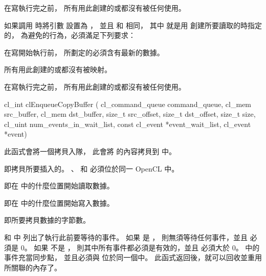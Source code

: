 \item 在寫執行完之前，
所有用此創建的或都沒有被任何使用。
\stopigBase

如果調用  時將引數  設置為 ，
並且  和  相同，
其中  就是用  創建所要讀取的時指定的，
為避免的行為，必須滿足下列要求：
\startigBase
\item 在寫開始執行前，
 所劃定的必須含有最新的數據。

\item 所有用此創建的或都沒有被映射。

\item 在寫執行完之前，
所有用此創建的或都沒有被任何使用。
\stopigBase
\stopnotepar%


\startCLFUNC
cl_int clEnqueueCopyBuffer (
			cl_command_queue command_queue,
			cl_mem src_buffer,
			cl_mem dst_buffer,
			size_t src_offset,
			size_t dst_offset,
			size_t size,
			cl_uint num_events_in_wait_list,
			const cl_event *event_wait_list,
			cl_event *event)
\stopCLFUNC

此函式會將一個拷貝入隊，
此會將  的內容拷貝到  中。

 即拷貝所要插入的。
、  和 
必須位於同一 OpenCL 中。

 即在  中的什麼位置開始讀取數據。

 即在  中的什麼位置開始寫入數據。

 即所要拷貝數據的字節數。

 和  中
列出了執行此前要等待的事件。
如果  是 ，
則無須等待任何事件，並且  必須是 0。
如果  不是 ，
則其中所有事件都必須是有效的，並且  必須大於 0。
 中的事件充當同步點，
並且必須與  位於同一個中。
此函式返回後，就可以回收並重用  所關聯的內存了。

